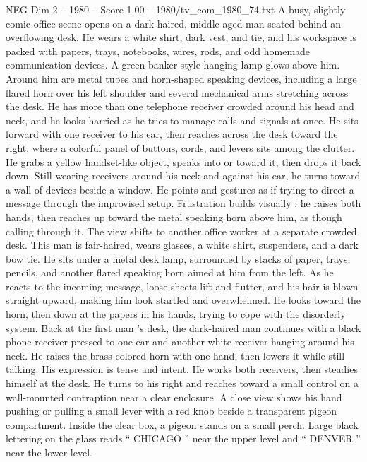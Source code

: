 \begin{textsample}{NEG Dim 2 – 1980 – Score 1.00 – 1980/tv\_com\_1980\_74.txt}  \label{ex:f2_neg_038}
A busy, slightly comic office scene opens on a dark-haired, middle-aged man seated behind an overflowing desk.
He wears a white shirt, dark vest, and tie, and his workspace is packed with papers, trays, notebooks, wires, rods, and odd homemade communication devices.
A green banker-style hanging lamp glows above him.
Around him are metal tubes and horn-shaped speaking devices, including a large flared horn over his left shoulder and several mechanical arms stretching across the desk.
He has more than one telephone receiver crowded around his head and neck, and he looks harried as he tries to manage calls and signals at once.
He sits forward with one receiver to his ear, then reaches across the desk toward the right, where a colorful panel of buttons, cords, and levers sits among the clutter.
He grabs a yellow handset-like object, speaks into or toward it, then drops it back down.
Still wearing receivers around his neck and against his ear, he turns toward a wall of devices beside a window.
He points and gestures as if trying to direct a message through the improvised setup.
Frustration builds visually : he raises both hands, then reaches up toward the metal speaking horn above him, as though calling through it.
The view shifts to another office worker at a separate crowded desk.
This man is fair-haired, wears glasses, a white shirt, suspenders, and a dark bow tie.
He sits under a metal desk lamp, surrounded by stacks of paper, trays, pencils, and another flared speaking horn aimed at him from the left.
As he reacts to the incoming message, loose sheets lift and flutter, and his hair is blown straight upward, making him look startled and overwhelmed.
He looks toward the horn, then down at the papers in his hands, trying to cope with the disorderly system.
Back at the first man ’s desk, the dark-haired man continues with a black phone receiver pressed to one ear and another white receiver hanging around his neck.
He raises the brass-colored horn with one hand, then lowers it while still talking.
His expression is tense and intent.
He works both receivers, then steadies himself at the desk.
He turns to his right and reaches toward a small control on a wall-mounted contraption near a clear enclosure.
A close view shows his hand pushing or pulling a small lever with a red knob beside a transparent pigeon compartment.
Inside the clear box, a pigeon stands on a small perch.
Large black lettering on the glass reads “ CHICAGO ” near the upper level and “ DENVER ” near the lower level.

\end{textsample}

